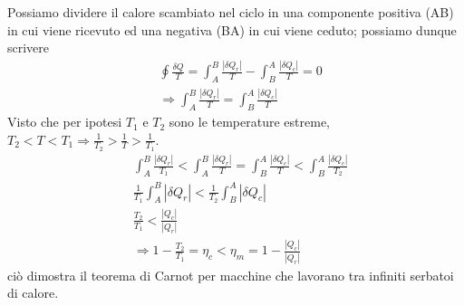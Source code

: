 \documentclass[10pt,a4paper]{article}
\begin{document}
Possiamo dividere il calore scambiato nel ciclo in una componente positiva (AB) in cui viene ricevuto ed una negativa (BA) in cui viene ceduto; possiamo dunque scrivere
\begin{align*}
	&\oint \frac{\delta Q}{T} = \int_A^B \frac{|\delta Q_r|}{T}- \int_B^A \frac{|\delta Q_c|}{T}= 0\\
	&\Rightarrow \int_A^B \frac{|\delta Q_r|}{T} = \int_B^A \frac{|\delta Q_c|}{T}
\end{align*}
Visto che per ipotesi \(T_1\) e \(T_2\) sono le temperature estreme, \(T_2<T<T_1 \Rightarrow \frac{1}{T_2}>\frac{1}{T}>\frac{1}{T_1}\).
\begin{align*}
	&\int_A^B \frac{|\delta Q_r|}{T_1} < \int_A^B \frac{|\delta Q_r|}{T} = \int_B^A \frac{|\delta Q_c|}{T} < \int_B^A \frac{|\delta Q_c|}{T_2}\\
	&\frac{1}{T_1} \int_A^B |\delta Q_r| < \frac{1}{T_2} \int_B^A |\delta Q_c|\\
	&\frac{T_2}{T_1} < \frac{|Q_c|}{|Q_r|}\\
	&\Rightarrow 1-\frac{T_2}{T_1} = \eta_c < \eta_m = 1-\frac{|Q_c|}{|Q_r|}
\end{align*} 
ciò dimostra il teorema di Carnot per macchine che lavorano tra infiniti serbatoi di calore. 
\end{document}
